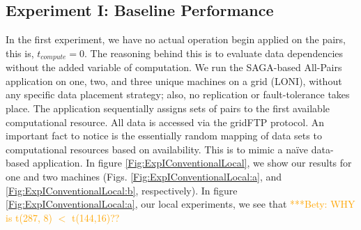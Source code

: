 \documentclass{rspublic}
\newcommand{\betynote}[1]{ {\textcolor{orange} { ***Bety: #1 }}}
\begin{document}
\subsection{Experiment I: Baseline Performance}
 In the first experiment, we have no actual operation begin applied on
the pairs, this is, $t_{compute}=0$. The reasoning behind this is to
evaluate data dependencies without the added variable of computation.
We run the SAGA-based All-Pairs application on one, two, and three
unique machines on a grid (LONI), without any specific data placement
strategy; also, no replication or fault-tolerance takes place. The
application sequentially assigns sets of pairs to the first available
computational resource. All data is accessed via the gridFTP protocol.
An important fact to notice is the essentially random mapping of data
sets to computational resources based on availability. This is to mimic
a naïve data-based application. In figure
\ref{Fig:ExpIConventionalLocal}, we show our results for one and two
machines (Figs. \ref{Fig:ExpIConventionalLocal:a}, and
\ref{Fig:ExpIConventionalLocal:b}, respectively). In figure
\ref{Fig:ExpIConventionalLocal:a}, our local experiments, we see that
\betynote{WHY is t(287, 8) $<$ t(144,16)??} 
\end{document}
